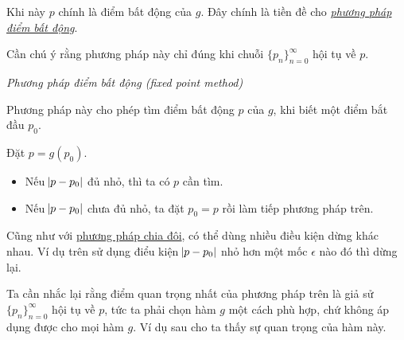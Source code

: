 \documentclass[../../Lectures.tex]{subfiles}
\begin{document}
Khi này \(p\) chính là điểm bất động của \(g\). Đây chính là tiền đề cho
\hyperref[method:fixed_point]{\emph{phương pháp điểm bất động}}.

Cần chú ý rằng phương pháp này chỉ đúng khi chuỗi \(\{p_n\}_{n=0}^\infty\) hội
tụ về \(p\).

\begin{method}\label{method:fixed_point}
    \emph{Phương pháp điểm bất động (fixed point method)}

    Phương pháp này cho phép tìm điểm bất động \(p\) của \(g\), khi biết một
    điểm bắt đầu \(p_0\).

    Đặt \(p = g(p_0)\).

    \begin{itemize}
        \item Nếu \(\abs{p - p_0}\) đủ nhỏ, thì ta có \(p\) cần tìm.
        \item Nếu \(\abs{p - p_0}\) chưa đủ nhỏ, ta đặt \(p_0 = p\) rồi làm tiếp
            phương pháp trên.
    \end{itemize}
\end{method}

Cũng như với \hyperref[method:bisection]{phương pháp chia đôi}, có thể dùng
nhiều điều kiện dừng khác nhau. Ví dụ trên sử dụng điểu kiện \(\abs{p - p_0}\)
nhỏ hơn một mốc \(\epsilon\) nào đó thì dừng lại.

Ta cần nhắc lại rằng điểm quan trọng nhất của phương pháp trên là giả sử
\(\{p_n\}_{n=0}^\infty\) hội tụ về \(p\), tức ta phải chọn hàm \(g\) một cách
phù hợp, chứ không áp dụng được cho mọi hàm \(g\). Ví dụ sau cho ta thấy sự quan
trọng của hàm này.
\end{document}
